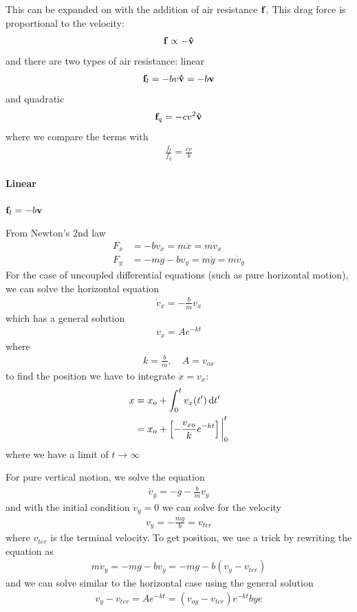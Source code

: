 \documentclass[../main.tex]{subfiles}
\begin{document}
This can be expanded on with the addition of air resistance $\vb{f}$. This drag force is
proportional to the velocity:
\begin{align*}
    \vb{f} \propto -\vu{v}
\end{align*}
and there are two types of air resistance: linear
\begin{align*}
    \vb{f}_l = -bv \vu{v} = -b \vb{v}
\end{align*}
and quadratic
\begin{align*}
    \vb{f}_q = -cv^2 \vu{v}
\end{align*}
where we compare the terms with
\begin{align*}
    \frac{f_l}{f_q} = \frac{cv}{b}
\end{align*}

\paragraph{Linear} $\vb{f}_l = -b \vb{v}$

From Newton's 2nd law
\begin{align*}
    F_x &= -bv_x = m\ddot x = m \dot v_x \\
    F_y &= -mg - bv_y = m\ddot y = m \dot v_y
\end{align*}
For the case of uncoupled differential equations (such as pure horizontal motion), we can solve the
horizontal equation
\begin{align*}
    \dot v_x = -\frac{b}{m} v_x 
\end{align*}
which has a general solution
\begin{align*}
    v_x = A e^{-kt}
\end{align*}
where
\begin{align*}
    k = \frac{b}{m}, \quad A = v_{ox}
\end{align*}
to find the position we have to integrate $\dot x = v_x$:
\begin{align*}
    x &= x_o + \int_0^t v_x(t') \dd{t'} \\
    &= x_o + \qt[-\frac{v_{xo}}{k} e^{-kt}]\eval_0^t
\end{align*}
where we have a limit of $t \rightarrow \infty$

For pure vertical motion, we solve the equation
\begin{align}
    \dot v_y = -g - \frac{b}{m} v_y
\end{align}
and with the initial condition $\dot v_y = 0$ we can solve for the velocity
\begin{align*}
    v_y = -\frac{mg}{b} = v_{ter}
\end{align*}
where $v_{ter}$ is the terminal velocity. To get position, we use a trick by rewriting the equation
as
\begin{align*}
    m\dot v_y = -mg - bv_y = -mg - b(v_y - v_{ter})
\end{align*}
and we can solve similar to the horizontal case using the general solution
\begin{align*}
    v_y - v_{ter} = A e^{-kt} = (v_{oy} - v_{ter}) e^{-kt}bye 
\end{align*}
\end{document}
